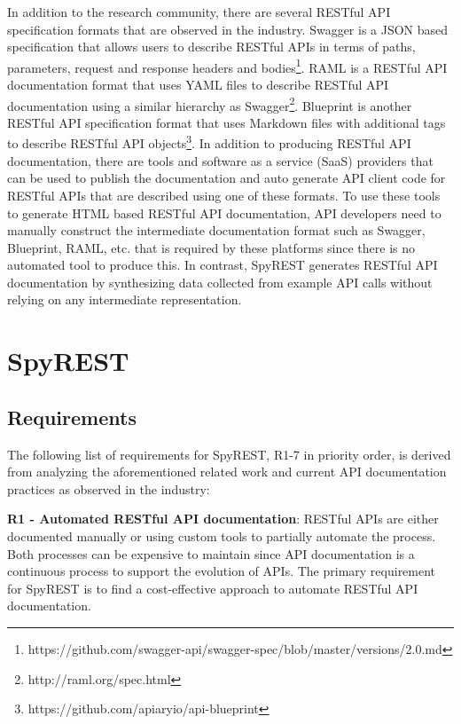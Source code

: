 \documentclass[conference]{IEEEtran}
\begin{document}
In addition to the research community, there are several RESTful API specification formats that are observed in the industry. Swagger is a JSON based specification that allows users to describe RESTful APIs in terms of paths, parameters, request and response headers and bodies\footnote{https://github.com/swagger-api/swagger-spec/blob/master/versions/2.0.md}. RAML is a RESTful API documentation format that uses YAML files to describe RESTful API documentation using a similar hierarchy as Swagger\footnote{http://raml.org/spec.html}. Blueprint is another RESTful API specification format that uses Markdown files with additional tags to describe RESTful API objects\footnote{https://github.com/apiaryio/api-blueprint}. In addition to producing RESTful API documentation, there are tools and software as a service (SaaS) providers that can be used to publish the documentation and auto generate API client code for RESTful APIs that are described using one of these formats. To use these tools to generate HTML based RESTful API documentation, API developers need to manually construct the intermediate documentation format such as Swagger, Blueprint, RAML, etc. that is required by these platforms since there is no automated tool to produce this. In contrast, SpyREST generates RESTful API documentation by synthesizing data collected from example API calls without relying on any intermediate representation.


\section{SpyREST} %
\label{sec:spyrest}

\subsection{Requirements} %
\label{sub:spyrest_requirements}

The following list of requirements for SpyREST, R1-7 in priority order, is derived from analyzing the aforementioned related work and current API documentation practices as observed in the industry:

  \textbf{R1 - Automated RESTful API documentation}: RESTful APIs are either documented manually or using custom tools to partially automate the process. Both processes can be expensive to maintain since API documentation is a continuous process to support the evolution of APIs. The primary requirement for SpyREST is to find a cost-effective approach to automate RESTful API documentation.
\end{document}
